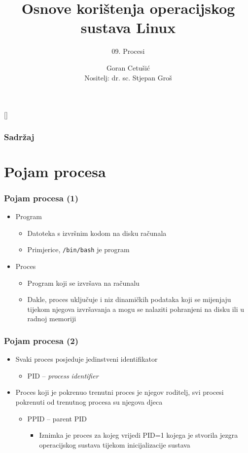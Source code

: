 \documentclass[table,usenames,dvipsnames]{beamer}
\title{Osnove korištenja operacijskog sustava Linux}
\subtitle{09. Procesi}
\author[Goran Cetušić]{Goran Cetušić\\{\small Nositelj: dr. sc. Stjepan Groš}}
\institute[FER]{Sveučilište u Zagrebu \\
				Fakultet elektrotehnike i računarstva}
\date{\todayiso}
\newcommand{\shell}[1]{\texttt{#1}}
\begin{document}
{
[] %

\begin{frame}
\maketitle
\end{frame}
}

\begin{frame}
\frametitle{Sadržaj}
\tableofcontents
\end{frame}

\section{Pojam procesa}
\begin{frame}[t]
\frametitle{Pojam procesa (1)}
\begin{itemize}
  \item Program
  \begin{itemize}
    \item Datoteka s izvršnim kodom na disku računala
    \item Primjerice, \shell{/bin/bash} je program
  \end{itemize}
  \item Proces
  \begin{itemize}
    \item Program koji se izvršava na računalu
    \item Dakle, proces uključuje i niz dinamičkih podataka koji se mijenjaju 
          tijekom njegova izvršavanja a mogu se nalaziti pohranjeni na disku              ili u radnoj memoriji
  \end{itemize}
\end{itemize}
\end{frame}

\begin{frame}[t]
\frametitle{Pojam procesa (2)}
\begin{itemize}
  \item Svaki proces posjeduje jedinstveni identifikator
  \begin{itemize}
    \item PID – \emph{process identifier}
  \end{itemize}
  \item Proces koji je pokrenuo trenutni proces je njegov roditelj, svi 
        procesi pokrenuti od trenutnog procesa su njegova djeca
  \begin{itemize}
    \item PPID – parent PID
    \begin{itemize}
      \item Iznimka je proces za kojeg vrijedi PID=1 kojega je stvorila 
            jezgra operacijskog sustava tijekom inicijalizacije sustava
    \end{itemize}
  \end{itemize}
\end{itemize}
\end{frame}
\end{document}
